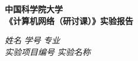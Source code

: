 \begin{center}
  \LARGE \bf 中国科学院大学 \\《计算机网络（研讨课）》实验报告
\end{center}

\begin{center}
  \emph{姓名} \underline{\makebox[7em][c]{\name}} 
  \emph{学号} \underline{\makebox[12em][c]{\studentNum}}
  \emph{专业} \underline{\makebox[15em][c]{\major}}\\
  \emph{实验项目编号} \underline{\makebox[3em][c]{\labNum}}
  \emph{实验名称} \underline{\makebox[30em][c]{\labName}}\\
\end{center}


  